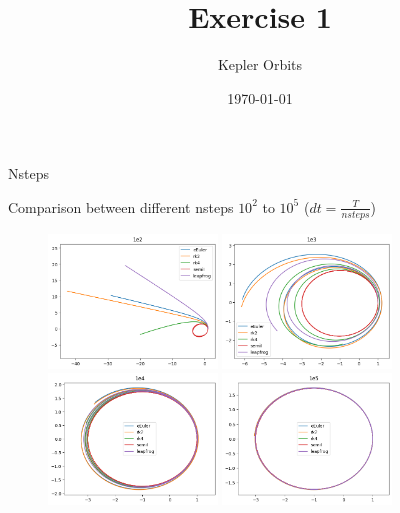 \documentclass{beamer}
\title{Exercise 1}
\subtitle{Kepler Orbits}
\date{\today}
\begin{document}
\begin{frame}
    \titlepage
\end{frame}

\begin{frame}{Nsteps}

	Comparison between different nsteps $10^2$ to $10^5$ ($dt = \frac{T}{nsteps}$)

\begin{figure}
\centering
    \includegraphics[width=0.4\textwidth]{../plots/1e2_plot.png}
    \includegraphics[width=0.4\textwidth]{../plots/1e3_plot.png}
    \includegraphics[width=0.4\textwidth]{../plots/1e4_plot.png}
    \includegraphics[width=0.4\textwidth]{../plots/1e5_plot.png}
    \label{fig:question}
\end{figure}
\end{frame}
\end{document}
